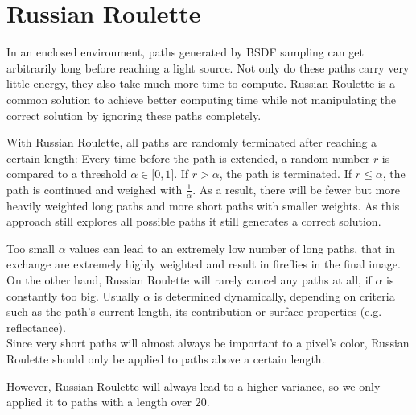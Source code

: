 \section{Russian Roulette}
\label{chapterRussianRoulette}
In an enclosed environment, paths generated by BSDF sampling can get arbitrarily long before reaching a light source. Not only do these paths carry very little energy, they also take much more time to compute. Russian Roulette is a common solution to achieve better computing time while not manipulating the correct solution by ignoring these paths completely.

With Russian Roulette, all paths are randomly terminated after reaching a certain length: Every time before the path is extended, a random number $r$ is compared to a threshold $\alpha \in \lbrack 0,1\rbrack$. If $r>\alpha$, the path is terminated. If $r \leq \alpha$, the path is continued and weighed with $\frac{1}{\alpha}$. As a result, there will be fewer but more heavily weighted long paths and more short paths with smaller weights. As this approach still explores all possible paths it still generates a correct solution.

Too small $\alpha$ values can lead to an extremely low number of long paths, that in exchange are extremely highly weighted and result in fireflies in the final image. On the other hand, Russian Roulette will rarely cancel any paths at all, if $\alpha$ is constantly too big. Usually $\alpha$ is determined dynamically, depending on criteria such as the path's current length, its contribution or surface properties (e.g. reflectance).\\
Since very short paths will almost always be important to a pixel's color, Russian Roulette should only be applied to paths above a certain length.

However, Russian Roulette will always lead to a higher variance, so we only applied it to paths with a length over $20$.

